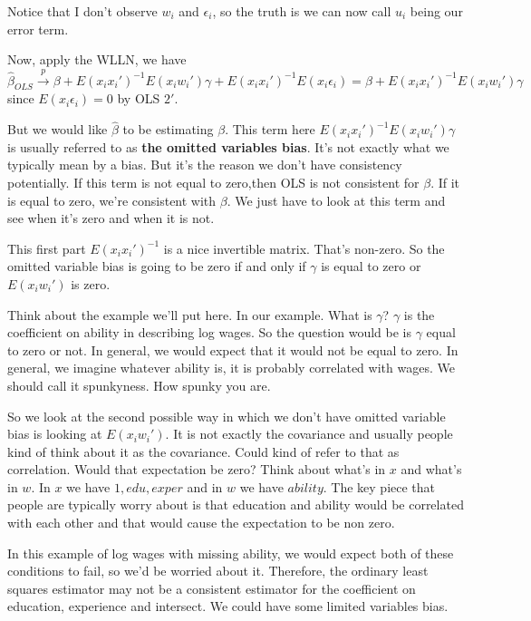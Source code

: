 \documentclass[11pt,a4paper]{amsart}
\theoremstyle{plain}
\theoremstyle{definition}
\begin{document}
 		Notice that I don't observe $w_{i}$ and $\epsilon_{i}$, so the truth is we can now call $u_{i}$ being our error term.\par 
 		Now, apply the WLLN, we have 
 		\[		\hat{\beta}_{OLS}  \stackrel{p}{\longrightarrow} \beta + E(x_{i}x_{i}')^{-1} E(x_{i}w_{i}')\gamma + E(x_{i}x_{i}')^{-1} E(x_{i}\epsilon_{i}) = \beta + E(x_{i}x_{i}')^{-1} E(x_{i}w_{i}')\gamma  	\]
 		since $E(x_{i}\epsilon_{i}) = 0$ by OLS $2'$.\par 
 		But we would like $\hat{\beta}$ to be estimating $\beta$. This term here $ E(x_{i}x_{i}')^{-1} E(x_{i}w_{i}')\gamma $ is usually referred to as \textbf{the omitted variables bias}. It's not exactly what we typically mean by a bias. But it's the reason we don't have consistency potentially. If this term is not equal to zero,then OLS is not consistent for $\beta$. If it is equal to zero, we're consistent with $\beta$. We just have to look at this term and see when it's zero and when it is not.\par 
 		This first part $E(x_{i}x_{i}')^{-1}$ is a nice invertible matrix. That's non-zero. So the omitted variable bias is going to be zero if and only if $\gamma$ is equal to zero or $E(x_{i}w_{i}')$ is zero.\par 
 		Think about the example we'll put here. In our example. What is $\gamma$? $\gamma$ is the coefficient on ability in describing log wages. So the question would be is $\gamma$ equal to zero or not. In general, we would expect that it would not be equal to zero. In general, we imagine whatever ability is, it is probably correlated with wages. We should call it spunkyness. How spunky you are.\par 
 		So we look at the second possible way in which we don't have omitted variable bias is looking at $E(x_{i}w_{i}')$. It is not exactly the covariance and usually people kind of think about it as the covariance. Could kind of refer to that as correlation. Would that expectation be zero? Think about what's in $x$ and what's in $w$. In $x$ we have $1, edu, exper$ and in $w$ we have $ability$. The key piece that people are typically worry about is that education and ability would be correlated with each other and that would cause the expectation to be non zero.\par 
 		 In this example of log wages with missing ability, we would expect both of these conditions to fail, so we'd be worried about it. Therefore, the ordinary least squares estimator may not be a consistent estimator for the coefficient on education, experience and intersect. We could have some limited variables bias.\par 
\end{document}
